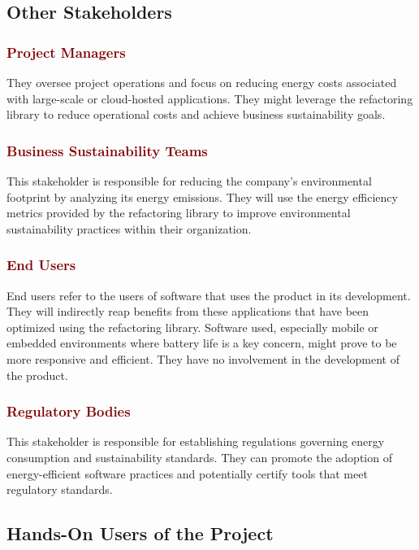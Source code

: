 \documentclass[12pt]{article}
\begin{document}
\subsection{Other Stakeholders}
\subsubsection*{\textcolor{Maroon}{Project Managers}}
They oversee project operations and focus on reducing energy costs associated with large-scale or cloud-hosted applications. They might leverage the refactoring library to reduce operational costs and achieve business sustainability goals.

\subsubsection*{\textcolor{Maroon}{Business Sustainability Teams}}
This stakeholder is responsible for reducing the company's environmental footprint by analyzing its energy emissions. They will use the energy efficiency metrics provided by the refactoring library to improve environmental sustainability practices within their organization.

\subsubsection*{\textcolor{Maroon}{End Users}}
End users refer to the users of software that uses the product in its development. They will indirectly reap benefits from these applications that have been optimized using the refactoring library. Software used, especially mobile or embedded environments where battery life is a key concern, might prove to be more responsive and efficient. They have no involvement in the development of the product. 

\subsubsection*{\textcolor{Maroon}{Regulatory Bodies}}
This stakeholder is responsible for establishing regulations governing energy consumption and sustainability standards. They can promote the adoption of energy-efficient software practices and potentially certify tools that meet regulatory standards. 

\subsection{Hands-On Users of the Project}
\end{document}
